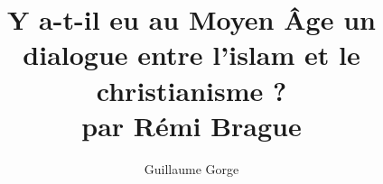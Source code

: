 \documentclass[oneside,10pt]{article}
\title{Y a-t-il eu au Moyen Âge un dialogue entre l’islam et le christianisme ? \\ par Rémi Brague}
\author{Guillaume Gorge}
\begin{document}
 

\maketitle





\setcounter{page}{1}
 



%
%

% 
%
%
%

%
%

%
%

 

%
%

%
\begin{singlespace}

\end{singlespace}
\end{document}
